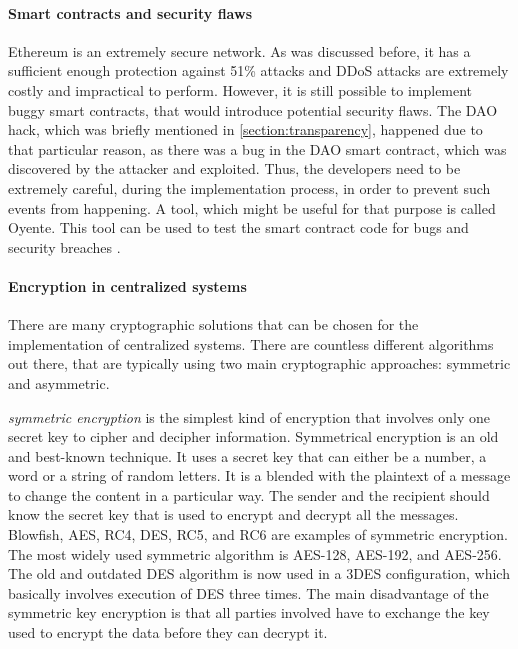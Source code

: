 \paragraph{Smart contracts and security flaws}
Ethereum is an extremely secure network. As was discussed before, it has a sufficient enough protection against 51\% attacks and DDoS attacks are extremely costly and impractical to perform. However, it is still possible to implement buggy smart contracts, that would introduce potential security flaws. The DAO hack, which was briefly mentioned in \ref{section:transparency}, happened due to that particular reason, as there was a bug in the DAO smart contract, which was discovered by the attacker and exploited. Thus, the developers need to be extremely careful, during the implementation process, in order to prevent such events from happening. A tool, which might be useful for that purpose is called Oyente. This tool can be used to test the smart contract code for bugs and security breaches \citep{oyente}.

\paragraph{Encryption in centralized systems}
There are many cryptographic solutions that can be chosen for the implementation of centralized systems. There are countless different algorithms out there, that are typically using two main cryptographic approaches: symmetric and asymmetric.

\textit{\Gls{symmetric encryption}} is the simplest kind of encryption that involves only one secret key to cipher and decipher information. Symmetrical encryption is an old and best-known technique. It uses a secret key that can either be a number, a word or a string of random letters. It is a blended with the plaintext of a message to change the content in a particular way. The sender and the recipient should know the secret key that is used to encrypt and decrypt all the messages. Blowfish, AES, RC4, DES, RC5, and RC6 are examples of symmetric encryption. The most widely used symmetric algorithm is AES-128, AES-192, and AES-256. The old and outdated DES algorithm is now used in a 3DES configuration, which basically involves execution of DES three times. The main disadvantage of the symmetric key encryption is that all parties involved have to exchange the key used to encrypt the data before they can decrypt it.

